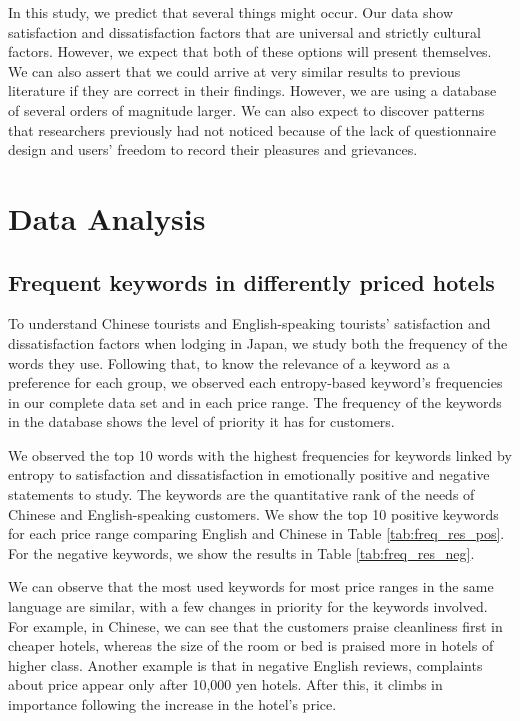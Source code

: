 \documentclass[smallextended,natbib]{svjour3}       %
\begin{document}
    In this study, we predict that several things might occur. Our data show satisfaction and dissatisfaction factors that are universal and strictly cultural factors. However, we expect that both of these options will present themselves. We can also assert that we could arrive at very similar results to previous literature if they are correct in their findings. However, we are using a database of several orders of magnitude larger. We can also expect to discover patterns that researchers previously had not noticed because of the lack of questionnaire design and users' freedom to record their pleasures and grievances.

\section{Data Analysis}\label{dataanalysis}

  \subsection{Frequent keywords in differently priced hotels}\label{svmresults}

    To understand Chinese tourists and English-speaking tourists' satisfaction and dissatisfaction factors when lodging in Japan, we study both the frequency of the words they use. Following that, to know the relevance of a keyword as a preference for each group, we observed each entropy-based keyword's frequencies in our complete data set and in each price range. The frequency of the keywords in the database shows the level of priority it has for customers.

    We observed the top 10 words with the highest frequencies for keywords linked by entropy to satisfaction and dissatisfaction in emotionally positive and negative statements to study. The keywords are the quantitative rank of the needs of Chinese and English-speaking customers. We show the top 10 positive keywords for each price range comparing English and Chinese in Table \ref{tab:freq_res_pos}. For the negative keywords, we show the results in Table \ref{tab:freq_res_neg}.

    We can observe that the most used keywords for most price ranges in the same language are similar, with a few changes in priority for the keywords involved. For example, in Chinese, we can see that the customers praise cleanliness first in cheaper hotels, whereas the size of the room or bed is praised more in hotels of higher class. Another example is that in negative English reviews, complaints about price appear only after 10,000 yen hotels. After this, it climbs in importance following the increase in the hotel's price.
\end{document}
